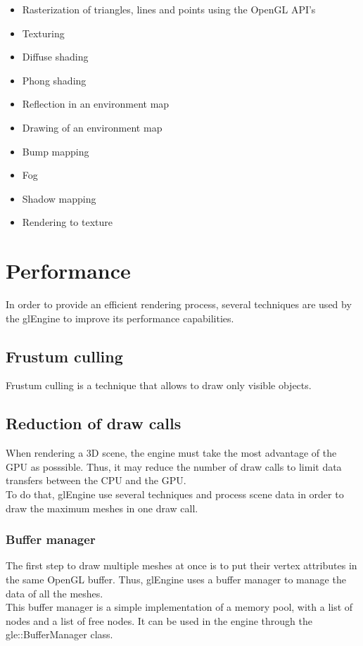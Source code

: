 \documentclass [a4 paper,11pt]{report}
\begin{document}
\begin{itemize}
\item Rasterization of triangles, lines and points using the OpenGL API's
\item Texturing
\item Diffuse shading
\item Phong shading
\item Reflection in an environment map
\item Drawing of an environment map
\item Bump mapping
\item Fog
\item Shadow mapping
\item Rendering to texture
\end{itemize}

\section{Performance}
In order to provide an efficient rendering process, several techniques are used by the glEngine to improve its performance capabilities.

\subsection{Frustum culling}
Frustum culling is a technique that allows to draw only visible objects.

\subsection{Reduction of draw calls}
When rendering a 3D scene, the engine must take the most advantage of the GPU as posssible. Thus, it may reduce the number of draw calls to limit data transfers between the CPU and the GPU.\\
To do that, glEngine use several techniques and process scene data in order to draw the maximum meshes in one draw call.

\subsubsection{Buffer manager}
The first step to draw multiple meshes at once is to put their vertex attributes in the same OpenGL buffer. Thus, glEngine uses a buffer manager to manage the data of all the meshes.\\
This buffer manager is a simple implementation of a memory pool, with a list of nodes and a list of free nodes. It can be used in the engine through the gle::BufferManager class.
\end{document}
